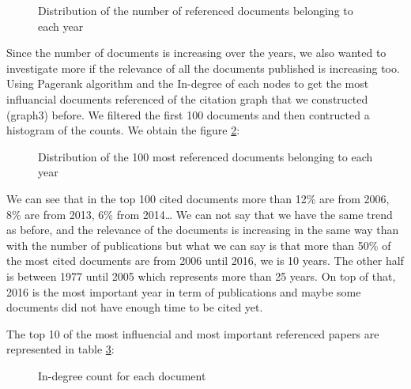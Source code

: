 \documentclass[article,twocolumn]{IEEEtran}
\begin{document}
    \begin{figure}
        \begin{center}\end{center}
        \caption{Distribution of the number of referenced documents belonging to each year}
        \label{count_ref_docs}
    \end{figure}
    
    Since the number of documents is increasing over the years, we also
wanted to investigate more if the relevance of all the documents
published is increasing too. Using Pagerank algorithm and the In-degree
of each nodes to get the most influancial documents referenced of the
citation graph that we constructed (graph3) before. We filtered the
first 100 documents and then contructed a histogram of the counts. We
obtain the figure \ref{fig7}:


    \begin{figure}
        \begin{center}\end{center}
        \caption{Distribution of the 100 most referenced documents belonging to each year}
        \label{fig7}
    \end{figure}
    
    We can see that in the top 100 cited documents more than 12\% are from
2006, 8\% are from 2013, 6\% from 2014\ldots{} We can not say that we
have the same trend as before, and the relevance of the documents is
increasing in the same way than with the number of publications but what
we can say is that more than 50\% of the most cited documents are from
2006 until 2016, we is 10 years. The other half is between 1977 until
2005 which represents more than 25 years. On top of that, 2016 is the
most important year in term of publications and maybe some documents did
not have enough time to be cited yet.

    The top 10 of the most influencial and most important referenced papers
are represented in table \ref{indegree}:


    \begin{figure}
        \begin{center}\end{center}
        \caption{In-degree count for each document}
        \label{indegree}
    \end{figure}
    
\end{document}
